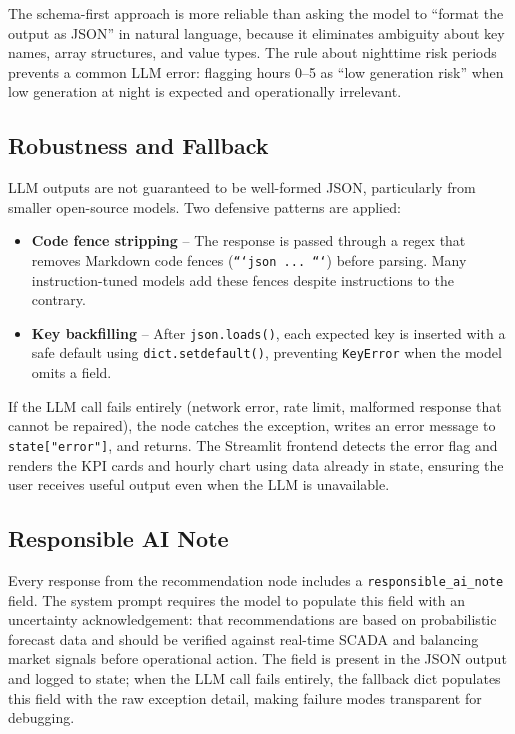 \documentclass[12pt, a4paper]{article}
\begin{document}
The schema-first approach is more reliable than asking the model to ``format the output as JSON'' in natural language, because it eliminates ambiguity about key names, array structures, and value types. The rule about nighttime risk periods prevents a common LLM error: flagging hours 0--5 as ``low generation risk'' when low generation at night is expected and operationally irrelevant.

\clearpage
\subsection{Robustness and Fallback}

LLM outputs are not guaranteed to be well-formed JSON, particularly from smaller open-source models. Two defensive patterns are applied:

\begin{itemize}[noitemsep]
    \item \textbf{Code fence stripping} -- The response is passed through a regex that removes Markdown code fences (\texttt{```json ... ```}) before parsing. Many instruction-tuned models add these fences despite instructions to the contrary.
    \item \textbf{Key backfilling} -- After \texttt{json.loads()}, each expected key is inserted with a safe default using \texttt{dict.setdefault()}, preventing \texttt{KeyError} when the model omits a field.
\end{itemize}

If the LLM call fails entirely (network error, rate limit, malformed response that cannot be repaired), the node catches the exception, writes an error message to \texttt{state["error"]}, and returns. The Streamlit frontend detects the error flag and renders the KPI cards and hourly chart using data already in state, ensuring the user receives useful output even when the LLM is unavailable.

\subsection{Responsible AI Note}

Every response from the recommendation node includes a \texttt{responsible\_ai\_note} field. The system prompt requires the model to populate this field with an uncertainty acknowledgement: that recommendations are based on probabilistic forecast data and should be verified against real-time SCADA and balancing market signals before operational action. The field is present in the JSON output and logged to state; when the LLM call fails entirely, the fallback dict populates this field with the raw exception detail, making failure modes transparent for debugging.
\end{document}
